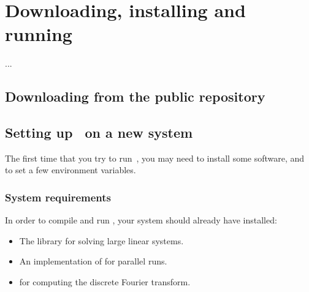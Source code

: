 \chapter{Downloading, installing and running \stella}\label{CHAP_INST}

...

\section{Downloading from the public repository}

\section{Setting up \stella~on a new system}

The first time that you try to run~\stella, you may need to install some software, and to set a few environment variables.

\subsection{System requirements}

In order to compile and run \stella, your system should already have installed:

\begin{itemize}
\item The \href{http://www.mcs.anl.gov/petsc/}{\PETSC} library for solving large linear systems.
\item An implementation of \MPI for parallel runs.
\item \href{http://www.fftw.org}{\FFTW} for computing the discrete Fourier transform.
\end{itemize}


